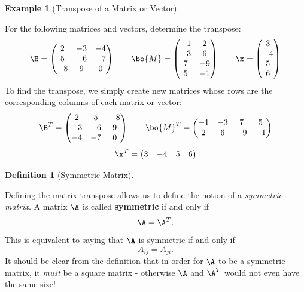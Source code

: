 \documentclass[
]{article}
\theoremstyle{definition}
\newtheorem{definition}{Definition}[section]
\theoremstyle{definition}
\newtheorem{example}{Example}[section]
\theoremstyle{definition}
\theoremstyle{definition}
\theoremstyle{remark}
\begin{document}
\begin{example}[Transpose of a Matrix or Vector]
\protect\hypertarget{exm:transpose}{}\label{exm:transpose}

For the following matrices and vectors, determine the transpose:
\[\B=\left(\begin{matrix} 2 & -3 & -4 \\5&-6&-7\\-8&9&0 \end{matrix}\right) \qquad \bo{M}=\left(\begin{matrix} -1&2\\-3&6\\7&-9\\5&-1 \end{matrix}\right) \qquad \x=\left(\begin{matrix}3\\-4\\5\\6\end{matrix}\right)\]
To find the transpose, we simply create new matrices whose rows are the corresponding columns of each matrix or vector:
\[\B^T=\left(\begin{matrix} 2 &5& -8\\-3&-6&9\\-4&-7&0\end{matrix}\right) \qquad \bo{M}^T = \left(\begin{matrix}-1&-3&7&5\\2&6&-9&-1 \end{matrix}\right) \] \[\x^T = \left(\begin{matrix} 3&-4&5&6 \end{matrix}\right)\]

\end{example}

\begin{definition}[Symmetric Matrix]
\protect\hypertarget{def:symdef}{}\label{def:symdef}

Defining the matrix transpose allows us to define the notion of a \emph{symmetric matrix}. A matrix \(\A\) is called \textbf{symmetric} if and only if \[\A=\A^T.\]
This is equivalent to saying that \(\A\) is symmetric if and only if
\[A_{ij}=A_{ji}.\]
It should be clear from the definition that in order for \(\A\) to be a symmetric matrix, it \emph{must} be a square matrix - otherwise \(\A\) and \(\A^T\) would not even have the same size!

\end{definition}
\end{document}

